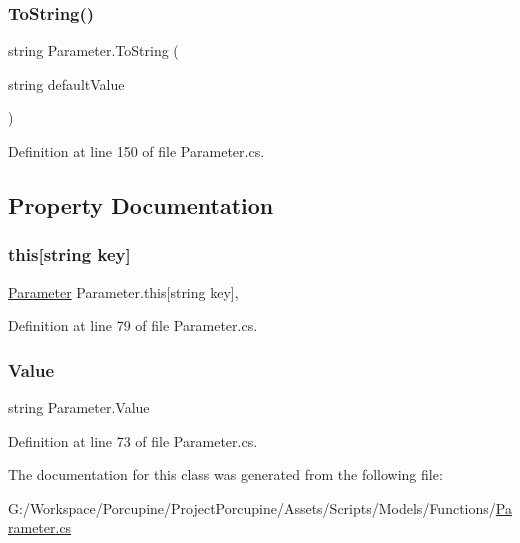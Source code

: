 \subsubsection{\texorpdfstring{To\+String()}{ToString()}\hspace{0.1cm}{\footnotesize\ttfamily [2/2]}}
{\footnotesize\ttfamily string Parameter.\+To\+String (\begin{DoxyParamCaption}\item[{string}]{default\+Value }\end{DoxyParamCaption})}



Definition at line 150 of file Parameter.\+cs.



\subsection{Property Documentation}
\mbox{\label{class_parameter_a308d90e26d11d730580a60f69617e301}} 
\subsubsection{\texorpdfstring{this[string key]}{this[string key]}}
{\footnotesize\ttfamily \hyperlink{class_parameter}{Parameter} Parameter.\+this\mbox{[}string key\mbox{]}\hspace{0.3cm}{\ttfamily [get]}, {\ttfamily [set]}}



Definition at line 79 of file Parameter.\+cs.

\mbox{\label{class_parameter_a5acbdef0b462cc13649df132ad4bcd50}} 
\subsubsection{\texorpdfstring{Value}{Value}}
{\footnotesize\ttfamily string Parameter.\+Value\hspace{0.3cm}{\ttfamily [get]}}



Definition at line 73 of file Parameter.\+cs.



The documentation for this class was generated from the following file\+:\begin{DoxyCompactItemize}
\item 
G\+:/\+Workspace/\+Porcupine/\+Project\+Porcupine/\+Assets/\+Scripts/\+Models/\+Functions/\hyperlink{_parameter_8cs}{Parameter.\+cs}\end{DoxyCompactItemize}
